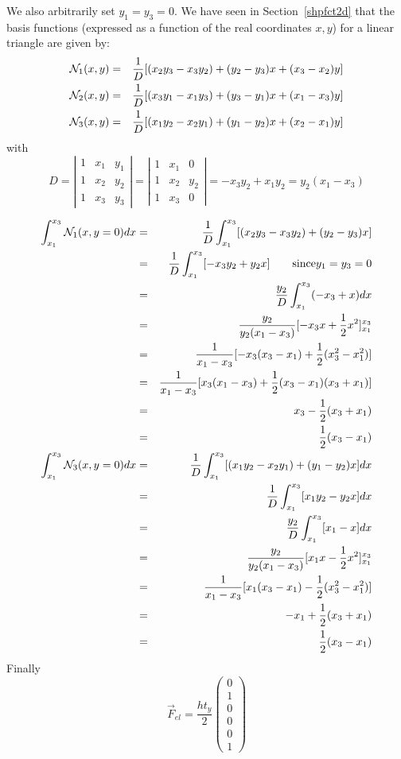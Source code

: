 We also arbitrarily set $y_1=y_3=0$. We have seen in Section~\ref{shpfct2d} that 
the basis functions (expressed as a function of the real coordinates $x,y$) 
for a linear triangle are given by:
\begin{eqnarray}
{\mathcal{N}}_1(x,y) &=& \frac{1}{D}[(x_2y_3-x_3y_2) + (y_2-y_3)x + (x_3-x_2)y] \nonumber\\
{\mathcal{N}}_2(x,y) &=& \frac{1}{D}[(x_3y_1-x_1y_3) + (y_3-y_1)x + (x_1-x_3)y] \nonumber\\
{\mathcal{N}}_3(x,y) &=& \frac{1}{D}[(x_1y_2-x_2y_1) + (y_1-y_2)x + (x_2-x_1)y] \nonumber
\end{eqnarray}
with 
\[
D = 
\left|
\begin{array}{ccc}
1 & x_1 & y_1 \\
1 & x_2 & y_2 \\
1 & x_3 & y_3 
\end{array}
\right|
=
\left|
\begin{array}{ccc}
1 & x_1 & 0 \\
1 & x_2 & y_2 \\
1 & x_3 & 0 
\end{array}
\right|
=
-x_3y_2+x_1y_2
= y_2(x_1-x_3)
\]


\begin{eqnarray}
\int_{x_1}^{x_3} {\mathcal{N}}_1(x,y=0) dx 
&=& \frac{1}{D} \int_{x_1}^{x_3} [(x_2y_3-x_3y_2) + (y_2-y_3)x ] \nonumber\\
&=& \frac{1}{D} \int_{x_1}^{x_3} [-x_3y_2 + y_2 x ] \qquad \text{since} y_1=y_3=0 \nonumber\\
&=& \frac{y_2}{D} \int_{x_1}^{x_3} (-x_3 +  x ) dx \nonumber\\
&=& \frac{y_2}{y_2(x_1-x_3)  } [ -x_3 x + \frac{1}{2}x^2]_{x_1}^{x_3} \nonumber\\ 
&=& \frac{1}{x_1-x_3 } [ -x_3 (x_3-x_1) + \frac{1}{2}(x_3^2-x_1^2)] \nonumber\\
&=& \frac{1}{x_1-x_3 } [ x_3 (x_1-x_3) + \frac{1}{2}(x_3-x_1)(x_3+x_1)] \nonumber\\
&=&  x_3 - \frac{1}{2}(x_3+x_1) \nonumber\\
&=&  \frac{1}{2} (x_3-x_1) \\
\int_{x_1}^{x_3} {\mathcal{N}}_3(x,y=0) dx
&=& \frac{1}{D} \int_{x_1}^{x_3}    [(x_1y_2-x_2y_1) + (y_1-y_2)x ] dx \nonumber\\
&=& \frac{1}{D} \int_{x_1}^{x_3}    [x_1y_2 - y_2x ] dx \nonumber\\
&=& \frac{y_2}{D} \int_{x_1}^{x_3}    [x_1 - x ] dx \nonumber\\
&=& \frac{y_2}{y_2(x_1-x_3) } [x_1 x - \frac{1}{2} x^2]_{x_1}^{x_3}  \nonumber\\
&=& \frac{1}{x_1-x_3} [x_1 (x_3-x_1) - \frac{1}{2} (x_3^2-x_1^2)] \nonumber\\
&=& -x_1  + \frac{1}{2} (x_3+ x_1) \nonumber\\
&=& \frac{1}{2}( x_3 -x_1 )
\end{eqnarray}
Finally
\[
\vec{F}_{el}=
\frac{h t_y}{2}
\left(
\begin{array}{c}
0\\
1 \\
0\\
0\\
0\\
1 
\end{array}
\right)
\]





